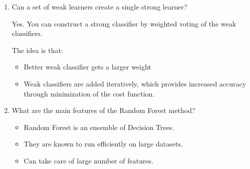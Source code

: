 \documentclass[12pt]{article}
\newenvironment{QandA}{\begin{enumerate}[label=\bfseries\arabic*.]\bfseries}
{\end{enumerate}}
\newenvironment{answered}{\par\normalfont\color{Sepia}}{}
\begin{document}
\begin{QandA}
    \item Can a set of weak learners create a single strong learner?
    \begin{answered}
        Yes.  You can construct a strong classifier by weighted voting of the 
        weak classifiers.

        The idea is that:
        \begin{itemize}
            \item Better weak classifier gets a larger weight
            \item Weak classifiers are added iteratively, which provides
                  increased accuracy through minimization of the cost function.
        \end{itemize}
    \end{answered}

    \item What are the main features of the Random Forest method?
    \begin{answered}
        \begin{itemize}
            \item Random Forest is an ensemble of Decision Trees.
            \item They are known to run efficiently on large datasets.
            \item Can take care of large number of features.
        \end{itemize}
\end{answered}

\end{QandA}
\end{document}
